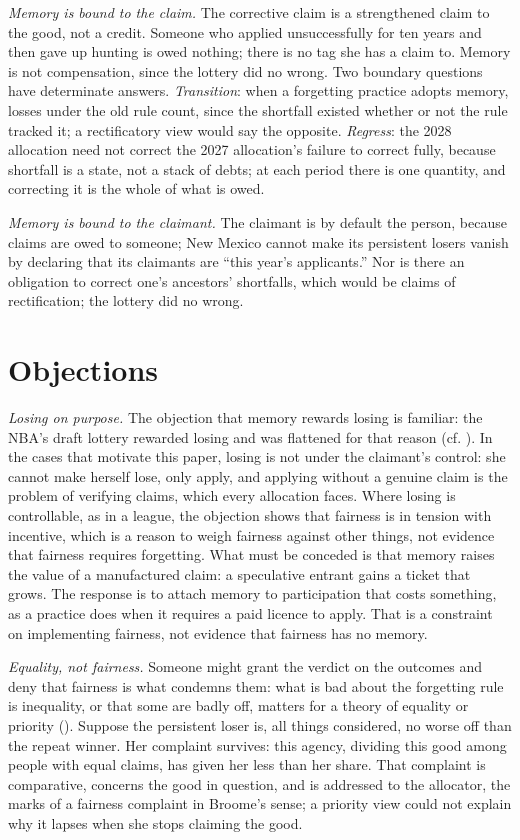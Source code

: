\documentclass[
  11pt,
  letterpaper,
  DIV=11,
  numbers=noendperiod,
  twoside]{scrartcl}
\begin{document}
\emph{Memory is bound to the claim.} The corrective claim is a
strengthened claim to the good, not a credit. Someone who applied
unsuccessfully for ten years and then gave up hunting is owed nothing;
there is no tag she has a claim to. Memory is not compensation, since
the lottery did no wrong. Two boundary questions have determinate
answers. \emph{Transition}: when a forgetting practice adopts memory,
losses under the old rule count, since the shortfall existed whether or
not the rule tracked it; a rectificatory view would say the opposite.
\emph{Regress}: the 2028 allocation need not correct the 2027
allocation's failure to correct fully, because shortfall is a state, not
a stack of debts; at each period there is one quantity, and correcting
it is the whole of what is owed.

\emph{Memory is bound to the claimant.} The claimant is by default the
person, because claims are owed to someone; New Mexico cannot make its
persistent losers vanish by declaring that its claimants are ``this
year's applicants.'' Nor is there an obligation to correct one's
ancestors' shortfalls, which would be claims of rectification; the
lottery did no wrong.

\section{Objections}\label{sec-objections}

\emph{Losing on purpose.} The objection that memory rewards losing is
familiar: the NBA's draft lottery rewarded losing and was flattened for
that reason (cf. ). In the cases
that motivate this paper, losing is not under the claimant's control:
she cannot make herself lose, only apply, and applying without a genuine
claim is the problem of verifying claims, which every allocation faces.
Where losing is controllable, as in a league, the objection shows that
fairness is in tension with incentive, which is a reason to weigh
fairness against other things, not evidence that fairness requires
forgetting. What must be conceded is that memory raises the value of a
manufactured claim: a speculative entrant gains a ticket that grows. The
response is to attach memory to participation that costs something, as a
practice does when it requires a paid licence to apply. That is a
constraint on implementing fairness, not evidence that fairness has no
memory.

\emph{Equality, not fairness.} Someone might grant the verdict on the
outcomes and deny that fairness is what condemns them: what is bad about
the forgetting rule is inequality, or that some are badly off, matters
for a theory of equality or priority (). Suppose the persistent loser is, all things considered, no worse
off than the repeat winner. Her complaint survives: this agency,
dividing this good among people with equal claims, has given her less
than her share. That complaint is comparative, concerns the good in
question, and is addressed to the allocator, the marks of a fairness
complaint in Broome's sense; a priority view could not explain why it
lapses when she stops claiming the good.
\end{document}
